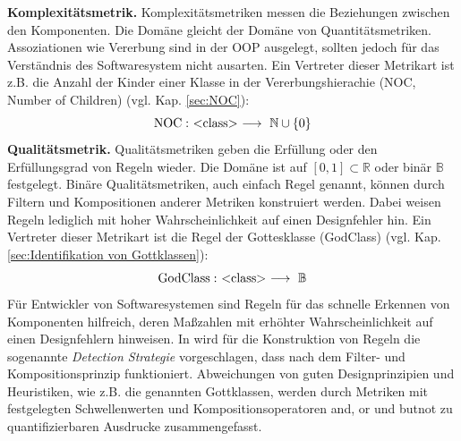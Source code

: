 \documentclass[12pt]{article}
\newcommand{\type}[1]{<\negthickspace\text{#1}\negthickspace> }
\begin{document}
\textbf{Komplexitätsmetrik.} Komplexitätsmetriken messen die
Beziehungen zwischen den Komponenten. Die Domäne gleicht der 
Domäne von Quantitätsmetriken. Assoziationen wie Vererbung sind
in der OOP ausgelegt, sollten jedoch für das Verständnis des
Softwaresystem
nicht ausarten. Ein Vertreter dieser Metrikart ist z.B. die Anzahl der
Kinder einer Klasse in der Vererbungshierachie (NOC, Number of
Children) (vgl. Kap. \ref{sec:NOC}):
\[
        \text{NOC}: ~ 
        \type{class}
        ~ \longrightarrow ~ \mathbb{N} \cup \left\{ 0
        \right\}
\]
\textbf{Qualitätsmetrik.} Qualitätsmetriken geben die Erfüllung
oder den Erfüllungsgrad von Regeln wieder. Die Domäne ist auf
$[0,1] \subset \mathbb{R}$ oder binär $\mathbb{B}$ festgelegt.
Binäre Qualitätsmetriken, auch einfach Regel genannt, können
durch Filtern und Kompositionen anderer Metriken konstruiert
werden. Dabei weisen Regeln lediglich  mit
hoher Wahrscheinlichkeit auf einen Designfehler hin. Ein Vertreter dieser Metrikart
ist die Regel der Gottesklasse (GodClass) (vgl. Kap.
\ref{sec:Identifikation von Gottklassen}):
\[
        \text{GodClass}: ~ 
        \type{class}
        ~ \longrightarrow ~ \mathbb{B} 
\]
Für Entwickler von Softwaresystemen sind Regeln für das schnelle
Erkennen von Komponenten hilfreich, deren Maßzahlen mit
erhöhter Wahrscheinlichkeit auf einen Designfehlern hinweisen.
In \cite{Mar04} wird für die Konstruktion von Regeln die
sogenannte \textit{Detection Strategie} vorgeschlagen, dass nach
dem Filter- und Kompositionsprinzip funktioniert. Abweichungen
von guten Designprinzipien und Heuristiken, wie z.B. die genannten Gottklassen,
werden durch Metriken mit festgelegten Schwellenwerten und
Kompositionsoperatoren \textsf{and}, \textsf{or} und
\textsf{butnot} zu quantifizierbaren Ausdrucke zusammengefasst.
%
%
%
%
\\
\\
\end{document}
